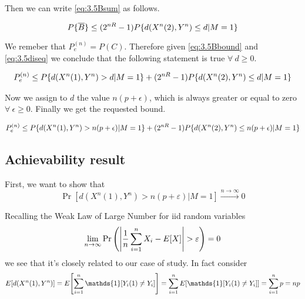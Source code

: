 Then we can write \eqref{eq:3.5Bsum} as follows.

\begin{equation}
	P\{\overline{B} \} \leq (2^{nR}-1) P \{ d(X^n(2),Y^n) \leq d | M = 1 \}
	\label{eq:3.5Bbound}
\end{equation}

We remeber that $P_e^{(n)}=P(C)$. Therefore given \eqref{eq:3.5Bbound} and \eqref{eq:3.5diseq} we conclude that the following statement is true $\forall \  d \geq 0$.

\begin{equation}
	\begin{gathered}
		P_e^{(n)} \leq
		P \{ d(X^n(1),Y^n)>d | M = 1 \} + (2^{nR}-1) P \{ d(X^n(2),Y^n) \leq d | M = 1 \}
	\end{gathered}
\end{equation}

Now we assign to $d$ the value $n(p+\epsilon)$, which is always greater or equal to zero $\forall \  \epsilon \geq 0$. Finally we get the requested bound.

\begin{equation}
	\begin{gathered}
		P_e^{(n)} \leq
		P \{ d(X^n(1),Y^n)> n(p+\epsilon) | M = 1 \} + (2^{nR}-1) P \{ d(X^n(2),Y^n) \leq n(p+\epsilon) | M = 1 \}
	\end{gathered}
\end{equation}

\subsection{Achievability result}

First, we want to show that
%
\begin{equation}\label{eq:3.5c_goal}
\Pr[d(X^n(1),Y^n)>n(p+\varepsilon) | M=1] \xrightarrow{n\rightarrow \infty} 0
\end{equation}

Recalling the Weak Law of Large Number for iid random variables
%
\begin{equation}
\lim_{n \rightarrow \infty} \Pr \qty( \qty|\frac{1}{n} \sum_{i=1}^{n} X_i - E[X]|> \varepsilon ) = 0
\end{equation}
%
we see that it's closely related to our case of study. In fact consider
%
\begin{equation}
E[d(X^n(1),Y^n)] = E\qty[ \sum_{i=1}^{n} \mathds{1}[Y_i(1) \neq Y_i] ] = \sum_{i=1}^n E[ \mathds{1}[Y_i(1) \neq Y_i] ] = \sum_{i=1}^n p = np
\end{equation}

